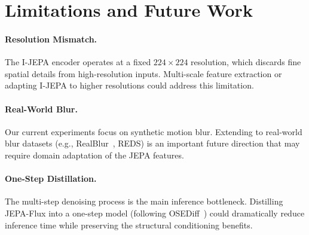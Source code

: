 \documentclass{article}
\begin{document}
\section{Limitations and Future Work}
\label{app:limitations}

\paragraph{Resolution Mismatch.}
The I-JEPA encoder operates at a fixed $224 \times 224$ resolution, which discards fine spatial details from high-resolution inputs. Multi-scale feature extraction or adapting I-JEPA to higher resolutions could address this limitation.

\paragraph{Real-World Blur.}
Our current experiments focus on synthetic motion blur. Extending to real-world blur datasets (e.g., RealBlur~\cite{nah2017deep}, REDS) is an important future direction that may require domain adaptation of the JEPA features.

\paragraph{One-Step Distillation.}
The multi-step denoising process is the main inference bottleneck. Distilling JEPA-Flux into a one-step model (following OSEDiff~\cite{wu2024osediff}) could dramatically reduce inference time while preserving the structural conditioning benefits.
\end{document}
